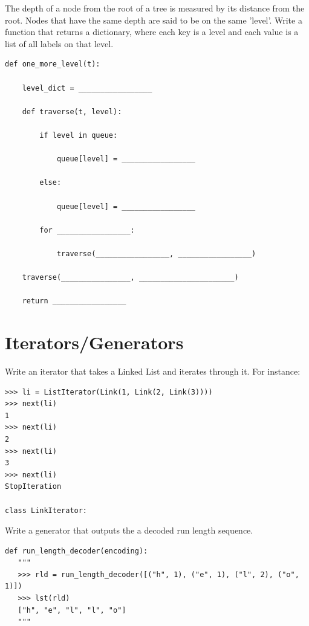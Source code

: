 \documentclass{exam}
\begin{document}
\begin{questions}
\item The depth of a node from the root of a tree is measured by its distance from the root. Nodes that have the same depth are said to be on the same 'level'. 
Write a function that returns a dictionary, where each key is a level and each value is a list of all labels on that level. 
 \begin{lstlisting}
def one_more_level(t):

    level_dict = _________________
    
    def traverse(t, level):
    
        if level in queue:
        
            queue[level] = _________________
            
        else:
        
            queue[level] = _________________
            
        for _________________:
        
            traverse(_________________, _________________)
            
    traverse(________________, ______________________)
    
    return _________________
\end{lstlisting}

\end{questions}

\section{Iterators/Generators}
\begin{questions}
\item Write an iterator that takes a Linked List and iterates through it. For instance: 
\begin{lstlisting}
>>> li = ListIterator(Link(1, Link(2, Link(3))))
>>> next(li)
1
>>> next(li)
2
>>> next(li)
3
>>> next(li)
StopIteration

class LinkIterator:
\end{lstlisting}
\vspace{3cm}

\item Write a generator that outputs the a decoded run length sequence.
\begin{lstlisting}
def run_length_decoder(encoding):
   """
   >>> rld = run_length_decoder([("h", 1), ("e", 1), ("l", 2), ("o", 1)])
   >>> lst(rld)
   ["h", "e", "l", "l", "o"]
   """
   
\end{lstlisting}
\end{questions}
\vspace{3cm}
\end{document}
